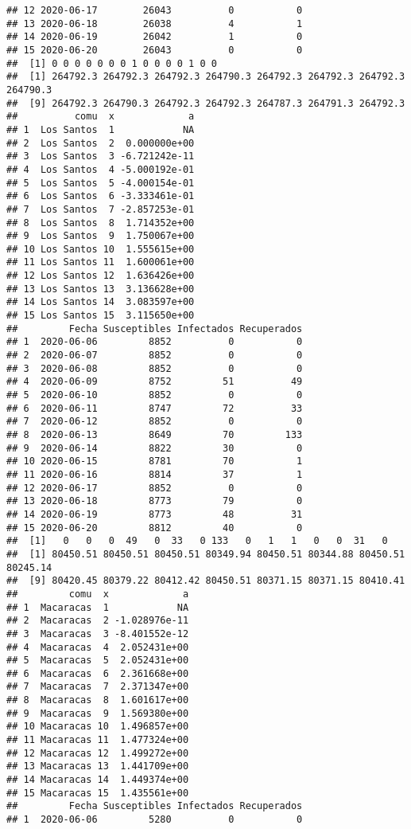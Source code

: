 \documentclass[
]{article}
\begin{document}
\begin{verbatim}
## 12 2020-06-17        26043          0           0
## 13 2020-06-18        26038          4           1
## 14 2020-06-19        26042          1           0
## 15 2020-06-20        26043          0           0
##  [1] 0 0 0 0 0 0 0 1 0 0 0 0 1 0 0
##  [1] 264792.3 264792.3 264792.3 264790.3 264792.3 264792.3 264792.3 264790.3
##  [9] 264792.3 264790.3 264792.3 264792.3 264787.3 264791.3 264792.3
##          comu  x             a
## 1  Los Santos  1            NA
## 2  Los Santos  2  0.000000e+00
## 3  Los Santos  3 -6.721242e-11
## 4  Los Santos  4 -5.000192e-01
## 5  Los Santos  5 -4.000154e-01
## 6  Los Santos  6 -3.333461e-01
## 7  Los Santos  7 -2.857253e-01
## 8  Los Santos  8  1.714352e+00
## 9  Los Santos  9  1.750067e+00
## 10 Los Santos 10  1.555615e+00
## 11 Los Santos 11  1.600061e+00
## 12 Los Santos 12  1.636426e+00
## 13 Los Santos 13  3.136628e+00
## 14 Los Santos 14  3.083597e+00
## 15 Los Santos 15  3.115650e+00
##         Fecha Susceptibles Infectados Recuperados
## 1  2020-06-06         8852          0           0
## 2  2020-06-07         8852          0           0
## 3  2020-06-08         8852          0           0
## 4  2020-06-09         8752         51          49
## 5  2020-06-10         8852          0           0
## 6  2020-06-11         8747         72          33
## 7  2020-06-12         8852          0           0
## 8  2020-06-13         8649         70         133
## 9  2020-06-14         8822         30           0
## 10 2020-06-15         8781         70           1
## 11 2020-06-16         8814         37           1
## 12 2020-06-17         8852          0           0
## 13 2020-06-18         8773         79           0
## 14 2020-06-19         8773         48          31
## 15 2020-06-20         8812         40           0
##  [1]   0   0   0  49   0  33   0 133   0   1   1   0   0  31   0
##  [1] 80450.51 80450.51 80450.51 80349.94 80450.51 80344.88 80450.51 80245.14
##  [9] 80420.45 80379.22 80412.42 80450.51 80371.15 80371.15 80410.41
##         comu  x             a
## 1  Macaracas  1            NA
## 2  Macaracas  2 -1.028976e-11
## 3  Macaracas  3 -8.401552e-12
## 4  Macaracas  4  2.052431e+00
## 5  Macaracas  5  2.052431e+00
## 6  Macaracas  6  2.361668e+00
## 7  Macaracas  7  2.371347e+00
## 8  Macaracas  8  1.601617e+00
## 9  Macaracas  9  1.569380e+00
## 10 Macaracas 10  1.496857e+00
## 11 Macaracas 11  1.477324e+00
## 12 Macaracas 12  1.499272e+00
## 13 Macaracas 13  1.441709e+00
## 14 Macaracas 14  1.449374e+00
## 15 Macaracas 15  1.435561e+00
##         Fecha Susceptibles Infectados Recuperados
## 1  2020-06-06         5280          0           0

\end{verbatim}
\end{document}
